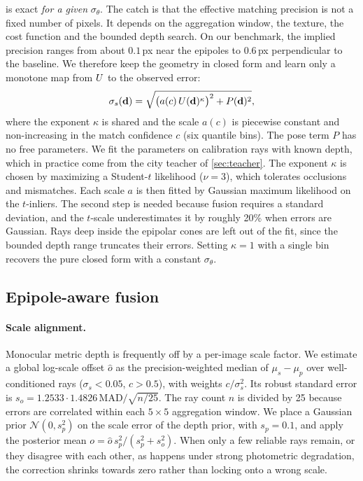  is exact \emph{for a given} $\sigma_\theta$. The catch is that the effective matching
precision is not a fixed number of pixels. It depends on the aggregation window, the texture, the cost
function and the bounded depth search. On our benchmark, the implied precision ranges from about
$0.1$\,px near the epipoles to $0.6$\,px perpendicular to the baseline. We therefore keep the geometry
in closed form and learn only a monotone map from $U$ to the observed error:
\begin{equation}
  \sigma_s(\mathbf{d}) = \sqrt{\big(a(c)\,U(\mathbf{d})^{\kappa}\big)^2 + P(\mathbf{d})^2},
  \label{eq:calibration}
\end{equation}
where the exponent $\kappa$ is shared and the scale $a(c)$ is piecewise constant and non-increasing in
the match confidence $c$ (six quantile bins). The pose term $P$ has no free parameters. We fit the
parameters on calibration rays with known depth, which in practice come from the city teacher of
\cref{sec:teacher}. The exponent $\kappa$ is chosen by maximizing a Student-$t$ likelihood ($\nu=3$),
which tolerates occlusions and mismatches. Each scale $a$ is then fitted by Gaussian maximum likelihood
on the $t$-inliers. The second step is needed because fusion requires a standard deviation, and the
$t$-scale underestimates it by roughly 20\% when errors are Gaussian. Rays deep inside the epipolar
cones are left out of the fit, since the bounded depth range truncates their errors. Setting $\kappa=1$
with a single bin recovers the pure closed form with a constant $\sigma_\theta$.

\subsection{Epipole-aware fusion}
\label{sec:fusion}

\paragraph{Scale alignment.}
Monocular metric depth is frequently off by a per-image scale factor. We estimate a global log-scale
offset $\hat o$ as the precision-weighted median of $\mu_s-\mu_p$ over well-conditioned rays
($\sigma_s<0.05$, $c>0.5$), with weights $c/\sigma_s^2$. Its robust standard error is
$s_o=1.2533\cdot1.4826\,\mathrm{MAD}/\sqrt{n/25}$. The ray count $n$ is divided by 25 because errors
are correlated within each $5\times5$ aggregation window. We place a Gaussian prior
$\mathcal{N}(0,s_p^2)$ on the scale error of the depth prior, with $s_p=0.1$, and apply the posterior
mean $o=\hat o\,s_p^2/(s_p^2+s_o^2)$. When only a few reliable rays remain, or they disagree with each
other, as happens under strong photometric degradation, the correction shrinks towards zero rather
than locking onto a wrong scale.

